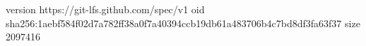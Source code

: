 version https://git-lfs.github.com/spec/v1
oid sha256:1aebf584f02d7a782ff38a0f7a40394ccb19db61a483706b4c7bd8df3fa63f37
size 2097416
